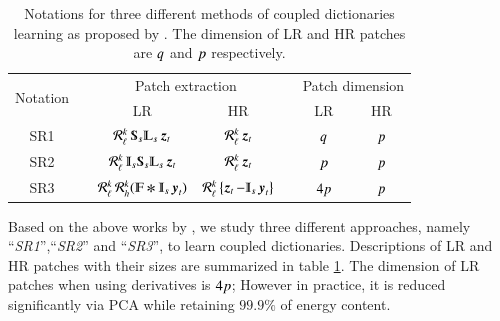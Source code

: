 \begin{table}
	\caption{\label{tab:DLapproaches}
	Notations for three different methods of coupled dictionaries learning as proposed by \citet{yang2010image,zeyde2012single}. The dimension of LR and HR patches are $ q $ and $ p $ respectively.}
	\vspace{.5cm}
	\centering
	\begin{tabular}{ccccccc} 
		\toprule \multirow{2}{*}{Notation}&\multicolumn{1}{c}{}&\multicolumn{2}{c}{Patch extraction}&\multicolumn{1}{c}{}&\multicolumn{2}{c}{Patch dimension}\\
		\cmidrule{3-4} \cmidrule{6-7}
	 & & {LR} & {HR} & & {LR} & {HR} \\
		\midrule 
		SR1  &&  $ \extractlow{k} \Sub_s\LPF_s\z_t $  & $ \operatorname{\mathcal{R}_{\ell}^{\mathit{k}}} \operatorname{\boldsymbol{z}}_t $ && $ q $ & $ p $\\
		SR2  &&  $ \extractlow{k} \Interp_s\Sub_s\LPF_s\z_t $  & $ \operatorname{\mathcal{R}_{\ell}^{\mathit{k}}} \operatorname{\boldsymbol{z}}_t $ && $ p $ & $ p $\\
		SR3  &&  $ \extractlow{k} \extracthigh{k}(\varmathbb{F} \Conv \Interp_s\y_t) $  & $ \extractlow{k} \left\lbrace \z_t - \Interp_s\y_t\right\rbrace$ && $ 4p $ & $ p $ \\
		\bottomrule
	\end{tabular}
\end{table}

Based on the above works by \citet{yang2010image,zeyde2012single}, we study three different approaches, namely ``\textit{SR1}'',``\textit{SR2}'' and ``\textit{SR3}'', to learn coupled dictionaries. Descriptions of LR and HR patches with their sizes are summarized in table \ref{tab:DLapproaches}. The dimension of LR patches when using derivatives is $ 4 p $; However in practice, it is reduced significantly via PCA while retaining $ 99.9 \% $ of energy content.

